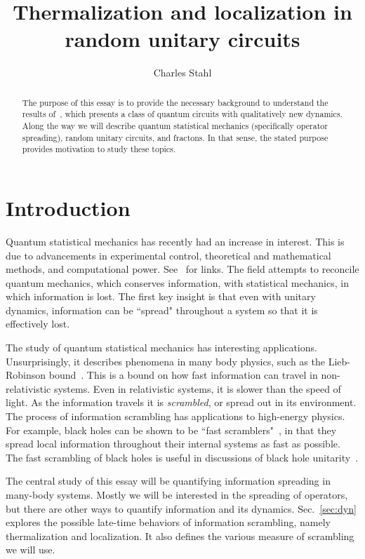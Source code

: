 \documentclass[a4paper,12pt]{article}
\title{Thermalization and localization in random unitary circuits}
\author{Charles Stahl}
\begin{document}
\maketitle

\begin{abstract}

The purpose of this essay is to provide the necessary background to understand the results of~\cite{PaiFracton}, which presents a class of quantum circuits with qualitatively new dynamics. Along the way we will describe quantum statistical mechanics (specifically operator spreading), random unitary circuits, and fractons. In that sense, the stated purpose provides motivation to study these topics.

\end{abstract}

\section{Introduction} \label{sec:intro}

Quantum statistical mechanics has recently had an increase in interest. This is due to advancements in experimental control, theoretical and mathematical methods, and computational power. See~\cite{GogolinStatMech, PolkovnikovClosed} for links. The field attempts to reconcile quantum mechanics, which conserves information, with statistical mechanics, in which information is lost. The first key insight is that even with unitary dynamics, information can be ``spread" throughout a system so that it is effectively lost.

The study of quantum statistical mechanics has interesting applications. Unsurprisingly, it describes phenomena in many body physics, such as the Lieb-Robinson bound~\cite{Lieb72, RobertsSwingle}. This is a bound on how fast information can travel in non-relativistic systems. Even in relativistic systems, it is slower than the speed of light. As the information travels it is \emph{scrambled}, or spread out in its environment. The process of information scrambling has applications to high-energy physics. For example, black holes can be shown to be ``fast scramblers"~\cite{SekinoSusskind}, in that they spread local information throughout their internal systems as fast as possible. The fast scrambling of black holes is useful in discussions of black hole unitarity~\cite{HaydenPreskill}.

The central study of this essay will be quantifying information spreading in many-body systems. Mostly we will be interested in the spreading of operators, but there are other ways to quantify information and its dynamics. Sec.~\ref{sec:dyn} explores the possible late-time behaviors of information scrambling, namely thermalization and localization. It also defines the various measure of scrambling we will use.
\end{document}
